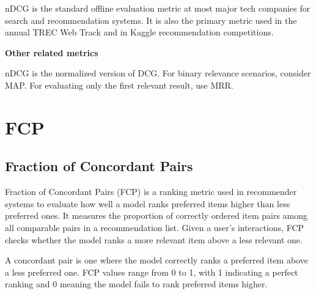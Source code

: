 {nDCG is the standard offline evaluation metric at most major tech companies for search and recommendation systems. It is also the primary metric
used in the annual TREC Web Track and in Kaggle recommendation competitions.}

\textbf{Other related metrics}

nDCG is the normalized version of DCG. For binary relevance scenarios, consider MAP. For evaluating only the first relevant result, use MRR.



\clearpage
\thispagestyle{rankingstyle}
\section{FCP}
\subsection{Fraction of Concordant Pairs}

Fraction of Concordant Pairs (FCP) is a ranking metric used in recommender systems to evaluate how well a model ranks
preferred items higher than less preferred ones. It measures the proportion of correctly ordered item pairs among all
comparable pairs in a recommendation list. Given a user’s interactions, FCP checks whether the model ranks a more relevant
item above a less relevant one.

\begin{center}
\end{center}

A concordant pair is one where the model correctly ranks a preferred item above a less preferred one. FCP values range from
0 to 1, with 1 indicating a perfect ranking and 0 meaning the model fails to rank preferred items higher.

